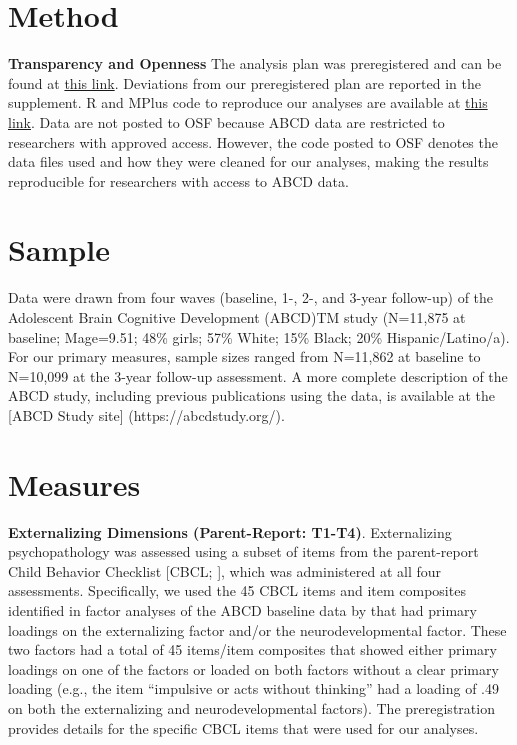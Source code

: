 \documentclass[
  20pt,
  number,
  preprint,
  3p,
  twocolumn]{elsarticle}
\begin{document}
\hypertarget{method}{%
\section{Method}\label{method}}

\textbf{Transparency and Openness} The analysis plan was preregistered
and can be found at
\href{https://osf.io/pqdfa/?view_only=a51ffc005e4f41daac4a3b804d23ddb2}{this
link}. Deviations from our preregistered plan are reported in the
supplement. R and MPlus code to reproduce our analyses are available at
\href{https://osf.io/ec36x/?view_only=d63a1452f133421b9e1bef34a41675f1}{this
link}. Data are not posted to OSF because ABCD data are restricted to
researchers with approved access. However, the code posted to OSF
denotes the data files used and how they were cleaned for our analyses,
making the results reproducible for researchers with access to ABCD
data.

\hypertarget{sample}{%
\section{Sample}\label{sample}}

Data were drawn from four waves (baseline, 1-, 2-, and 3-year follow-up)
of the Adolescent Brain Cognitive Development (ABCD)TM study (N=11,875
at baseline; Mage=9.51; 48\% girls; 57\% White; 15\% Black; 20\%
Hispanic/Latino/a). For our primary measures, sample sizes ranged from
N=11,862 at baseline to N=10,099 at the 3-year follow-up assessment. A
more complete description of the ABCD study, including previous
publications using the data, is available at the {[}ABCD Study site{]}
(https://abcdstudy.org/).

\hypertarget{measures}{%
\section{Measures}\label{measures}}

\textbf{Externalizing Dimensions (Parent-Report: T1-T4)}. Externalizing
psychopathology was assessed using a subset of items from the
parent-report Child Behavior Checklist {[}CBCL;
\citep{achenbach1999}{]}, which was administered at all four
assessments. Specifically, we used the 45 CBCL items and item composites
identified in factor analyses of the ABCD baseline data by
\citep{michelini2019} that had primary loadings on the externalizing
factor and/or the neurodevelopmental factor. These two factors had a
total of 45 items/item composites that showed either primary loadings on
one of the factors or loaded on both factors without a clear primary
loading (e.g., the item ``impulsive or acts without thinking'' had a
loading of .49 on both the externalizing and neurodevelopmental
factors). The preregistration provides details for the specific CBCL
items that were used for our analyses.
\end{document}
